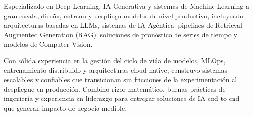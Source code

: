 %
%
%
\par{
Especializado en Deep Learning, IA Generativa y sistemas de Machine Learning a gran escala, diseño, entreno y despliego modelos de nivel productivo, incluyendo arquitecturas basadas en LLMs, sistemas de IA Agéntica, pipelines de Retrieval-Augmented Generation (RAG), soluciones de pronóstico de series de tiempo y modelos de Computer Vision.
}
\par{
Con sólida experiencia en la gestión del ciclo de vida de modelos, MLOps, entrenamiento distribuido y arquitecturas cloud-native, construyo sistemas escalables y confiables que transicionan sin fricciones de la experimentación al despliegue en producción. Combino rigor matemático, buenas prácticas de ingeniería y experiencia en liderazgo para entregar soluciones de IA end-to-end que generan impacto de negocio medible.
}
\vspace{1em}